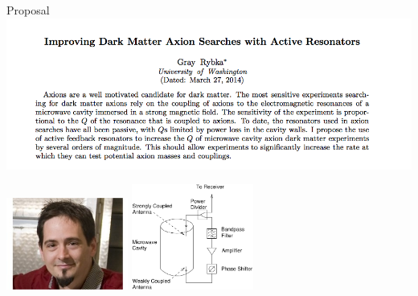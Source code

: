 \documentclass{beamer}
\begin{document}
\begin{frame}{Proposal}
\centering
\includegraphics[width=\textwidth]{arxiv_snapshot}

\includegraphics[width=0.3\textwidth]{gray_headshot}
\includegraphics[width=0.3\textwidth]{experiment_schematic-eps-converted-to}

\end{frame}
\end{document}

